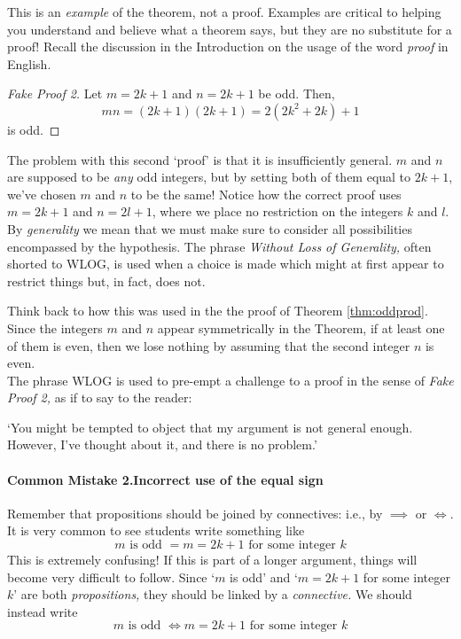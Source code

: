 \noindent This is an \emph{example} of the theorem, not a proof. Examples are critical to helping you understand and believe what a theorem says, but they are no substitute for a proof! Recall the discussion in the Introduction on the usage of the word \emph{proof} in English.

\begin{proof}[Fake Proof 2]
Let $m=2k+1$ and $n=2k+1$ be odd. Then,
\[mn=(2k+1)(2k+1)=2(2k^2+2k)+1\]
is odd.
\end{proof}

\noindent The problem with this second `proof' is that it is insufficiently general. $m$ and $n$ are supposed to be \emph{any} odd integers, but by setting both of them equal to $2k+1$, we've chosen $m$ and $n$ to be the same! Notice how the correct proof uses $m=2k+1$ and $n=2l+1$, where we place no restriction on the integers $k$ and $l$.\\


\noindent By \emph{generality} we mean that we must make sure to consider all possibilities encompassed by the hypothesis. The phrase \emph{Without Loss of Generality,} often shorted to WLOG, is used when a choice is made which might at first appear to restrict things but, in fact, does not.

Think back to how this was used in the the proof of Theorem \ref{thm:oddprod}. Since the integers $m$ and $n$ appear symmetrically in the Theorem, if at least one of them is even, then we lose nothing by assuming that the second integer $n$ is even.\\

The phrase WLOG is used to pre-empt a challenge to a proof in the sense of \emph{Fake Proof 2,} as if to say to the reader:
\begin{center}
`You might be tempted to object that my argument is not general enough. However, I've thought about it, and there is no problem.'\\
\end{center}

\paragraph{Common Mistake 2.\quad Incorrect use of the equal sign}

Remember that propositions should be joined by connectives: i.e., by $\implies$ or $\iff$. It is very common to see students write something like
\[\text{$m$ is odd $=m=2k+1$ for some integer $k$}\]
This is extremely confusing! If this is part of a longer argument, things will become very difficult to follow. Since `$m$ is odd' and `$m=2k+1$ for some integer $k$' are both \emph{propositions,} they should be linked by a \emph{connective.} We should instead write
\[\text{$m$ is odd $\iff m=2k+1$ for some integer $k$}\]

